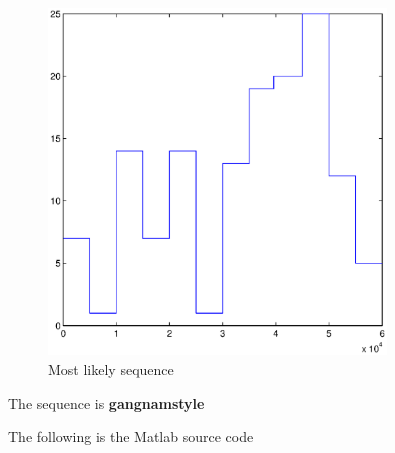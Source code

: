 \documentclass[18pt]{article} %
\title{\textbf{ \begin{LARGE}CSE150:Introduction to Artificial Intelligence\end{LARGE}}\\ [0ex]\begin{Large} Homework 4 \end{Large} }
\author{Ning Ma}
\date{} %
\theoremstyle{definition}\newtheorem{law}{Law}
\theoremstyle{plain}\newtheorem{jury}[law]{Jury}
\theoremstyle{remark}\newtheorem{juu}{Juu}
\theoremstyle{definition}\newtheorem{kuu}[law]{Kuu}
\theoremstyle{definition}\newtheorem{muu}{Muu}[section]
\theoremstyle{definition}\newtheorem{honoluu}{Honoluu}[section]
\theoremstyle{definition}\newtheorem{konoluu}[muu]{Konoluu}
\begin{document}
\begin{figure}[htbp]
\centering
\includegraphics[width=0.8\textwidth]{S_STAR.eps}
\caption{Most likely sequence}
\label{LLH1}
\end{figure}
The sequence is \textbf{gangnamstyle}

The following is the Matlab source code\\
\end{document}
